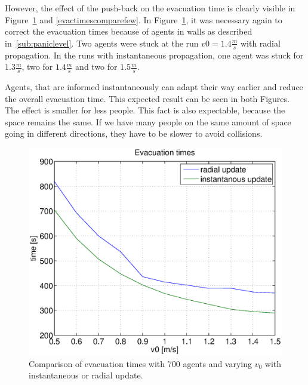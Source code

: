 \documentclass[11pt]{article}
\begin{document}
However, the effect of the push-back on the evacuation time is clearly visible in Figure~\ref{evactimescomparemany} and \ref{evactimescomparefew}.
In Figure~\ref{evactimescomparemany}, it was necessary again to correct the evacuation times 
because of agents in walls as described in~\ref{sub:paniclevel}. 
Two agents were stuck at the run \(v0 = 1.4\frac{m}{s}\) with radial propagation.
In the runs with instantaneous propagation, one agent was stuck for \(1.3\frac{m}{s}\), two for \(1.4\frac{m}{s}\) and two for \(1.5\frac{m}{s}\).

Agents, that are informed instantaneously can adapt their way earlier and reduce the overall
evacuation time. This expected result can be seen in both Figures. 
The effect is smaller for less people. This fact is also expectable, because the space
remains the same. If we have many people on the same amount of space going in different directions,
they have to be slower to avoid collisions.

\begin{figure}[h]
	\centering
	\includegraphics[scale=0.5]{images/evactimescomparemany.eps}
	\caption{Comparison of evacuation times with 700 agents and varying \(v_0\) with instantaneous or radial update. 	}
	\label{evactimescomparemany}
\end{figure}
\end{document}
